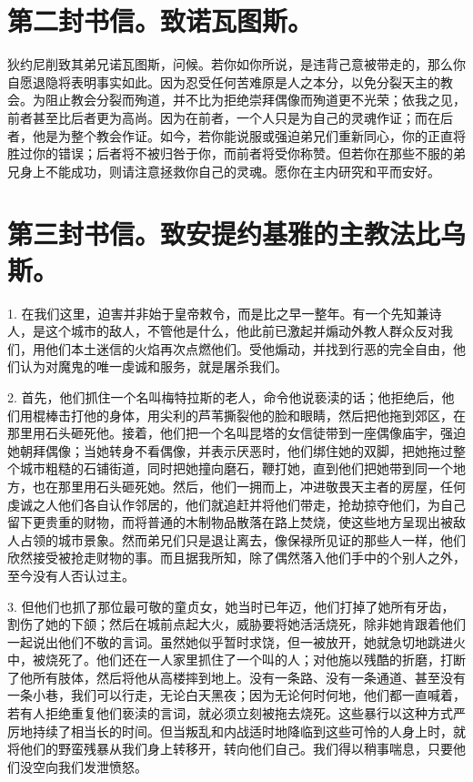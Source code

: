 
\section{第二封书信。致诺瓦图斯。}

狄约尼削致其弟兄诺瓦图斯，问候。若你如你所说，是违背己意被带走的，那么你自愿退隐将表明事实如此。因为忍受任何苦难原是人之本分，以免分裂天主的教会。为阻止教会分裂而殉道，并不比为拒绝崇拜偶像而殉道更不光荣；依我之见，前者甚至比后者更为高尚。因为在前者，一个人只是为自己的灵魂作证；而在后者，他是为整个教会作证。如今，若你能说服或强迫弟兄们重新同心，你的正直将胜过你的错误；后者将不被归咎于你，而前者将受你称赞。但若你在那些不服的弟兄身上不能成功，则请注意拯救你自己的灵魂。愿你在主内研究和平而安好。\par


\section{第三封书信。致安提约基雅的主教法比乌斯。}

1. 在我们这里，迫害并非始于皇帝敕令，而是比之早一整年。有一个先知兼诗人，是这个城市的敌人，不管他是什么，他此前已激起并煽动外教人群众反对我们，用他们本土迷信的火焰再次点燃他们。受他煽动，并找到行恶的完全自由，他们认为对魔鬼的唯一虔诚和服务，就是屠杀我们。\par

2. 首先，他们抓住一个名叫梅特拉斯的老人，命令他说亵渎的话；他拒绝后，他们用棍棒击打他的身体，用尖利的芦苇撕裂他的脸和眼睛，然后把他拖到郊区，在那里用石头砸死他。接着，他们把一个名叫昆塔的女信徒带到一座偶像庙宇，强迫她朝拜偶像；当她转身不看偶像，并表示厌恶时，他们绑住她的双脚，把她拖过整个城市粗糙的石铺街道，同时把她撞向磨石，鞭打她，直到他们把她带到同一个地方，也在那里用石头砸死她。然后，他们一拥而上，冲进敬畏天主者的房屋，任何虔诚之人他们各自认作邻居的，他们就追赶并将他们带走，抢劫掠夺他们，为自己留下更贵重的财物，而将普通的木制物品散落在路上焚烧，使这些地方呈现出被敌人占领的城市景象。然而弟兄们只是退让离去，像保禄所见证的那些人一样，他们欣然接受被抢走财物的事。而且据我所知，除了偶然落入他们手中的个别人之外，至今没有人否认过主。\par

3. 但他们也抓了那位最可敬的童贞女，她当时已年迈，他们打掉了她所有牙齿，割伤了她的下颌；然后在城前点起大火，威胁要将她活活烧死，除非她肯跟着他们一起说出他们不敬的言词。虽然她似乎暂时求饶，但一被放开，她就急切地跳进火中，被烧死了。他们还在一人家里抓住了一个叫的人；对他施以残酷的折磨，打断了他所有肢体，然后将他从高楼摔到地上。没有一条路、没有一条通道、甚至没有一条小巷，我们可以行走，无论白天黑夜；因为无论何时何地，他们都一直喊着，若有人拒绝重复他们亵渎的言词，就必须立刻被拖去烧死。这些暴行以这种方式严厉地持续了相当长的时间。但当叛乱和内战适时地降临到这些可怜的人身上时，就将他们的野蛮残暴从我们身上转移开，转向他们自己。我们得以稍事喘息，只要他们没空向我们发泄愤怒。\par

